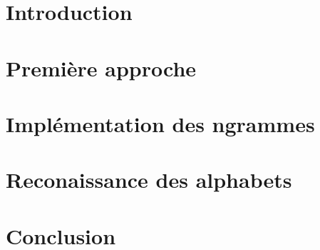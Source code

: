 \documentclass[a4paper]{article}
\begin{document}
	


	\tableofcontents
	\newpage
	

	\section*{Introduction}
	


	\section{Première approche}
	
	
	
	\section{Implémentation des ngrammes}
	
	

	\section{Reconaissance des alphabets}
	

	
	\section*{Conclusion}
	
	\newpage
	
	
	
\end{document}
